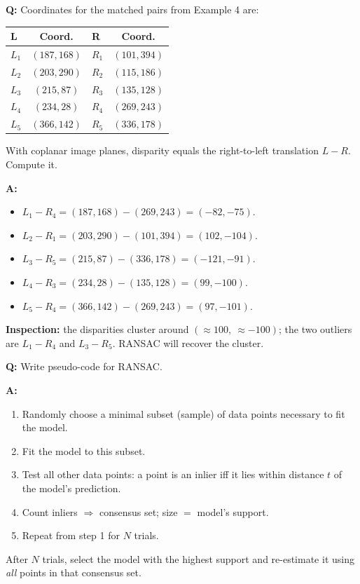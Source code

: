 \begin{exbox}[Example 5: Disparity = right $\to$ left translation]
\textbf{Q:} Coordinates for the matched pairs from Example 4 are:

\begin{center}
\begin{tabular}{@{} l c l c @{}}
\toprule
\textbf{L} & \textbf{Coord.} & \textbf{R} & \textbf{Coord.} \\
\midrule
$L_1$ & $(187, 168)$ & $R_1$ & $(101, 394)$ \\
$L_2$ & $(203, 290)$ & $R_2$ & $(115, 186)$ \\
$L_3$ & $(215,  87)$ & $R_3$ & $(135, 128)$ \\
$L_4$ & $(234,  28)$ & $R_4$ & $(269, 243)$ \\
$L_5$ & $(366, 142)$ & $R_5$ & $(336, 178)$ \\
\bottomrule
\end{tabular}
\end{center}
With coplanar image planes, disparity equals the right-to-left translation $L - R$. Compute it.

\textbf{A:}
\begin{itemize}
  \item $L_1 - R_4 = (187,168) - (269,243) = (-82, -75)$.
  \item $L_2 - R_1 = (203,290) - (101,394) = (102, -104)$.
  \item $L_3 - R_5 = (215, 87) - (336,178) = (-121, -91)$.
  \item $L_4 - R_3 = (234, 28) - (135,128) = (99, -100)$.
  \item $L_5 - R_4 = (366,142) - (269,243) = (97, -101)$.
\end{itemize}
\textbf{Inspection:} the disparities cluster around $(\approx 100,\ \approx -100)$; the two outliers are $L_1{-}R_4$ and $L_3{-}R_5$. RANSAC will recover the cluster.
\end{exbox}

\begin{exbox}
\textbf{Q:} Write pseudo-code for RANSAC.

\textbf{A:}
\begin{enumerate}
  \item Randomly choose a minimal subset (sample) of data points necessary to fit the model.
  \item Fit the model to this subset.
  \item Test all other data points: a point is an inlier iff it lies within distance $t$ of the model's prediction.
  \item Count inliers $\Rightarrow$ consensus set; size $=$ model's support.
  \item Repeat from step 1 for $N$ trials.
\end{enumerate}
After $N$ trials, select the model with the highest support and re-estimate it using \emph{all} points in that consensus set.
\end{exbox}

